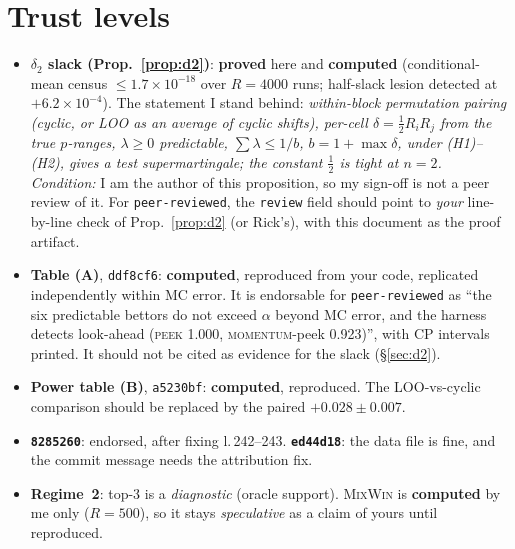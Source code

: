 \documentclass[11pt]{article}
\begin{document}
\section{Trust levels}\label{sec:trust}
\begin{itemize}[nosep]
\item \textbf{$\delta_2$ slack (Prop.~\ref{prop:d2})}: \textbf{proved} here and \textbf{computed} (conditional-mean census $\le1.7\times10^{-18}$ over $R=4000$ runs; half-slack lesion detected at $+6.2\times10^{-4}$). The statement I stand behind: \emph{within-block permutation pairing (cyclic, or LOO as an average of cyclic shifts), per-cell $\delta=\tfrac12R_iR_j$ from the true $p$-ranges, $\lambda\ge0$ predictable, $\sum\lambda\le1/b$, $b=1+\max\delta$, under (H1)--(H2), gives a test supermartingale; the constant $\tfrac12$ is tight at $n=2$.}
\emph{Condition:} I am the author of this proposition, so my sign-off is not a peer review of it. For \texttt{peer-reviewed}, the \texttt{review} field should point to \emph{your} line-by-line check of Prop.~\ref{prop:d2} (or Rick's), with this document as the proof artifact.
\item \textbf{Table (A)}, \texttt{ddf8cf6}: \textbf{computed}, reproduced from your code, replicated independently within MC error. It is endorsable for \texttt{peer-reviewed} as ``the six predictable bettors do not exceed $\alpha$ beyond MC error, and the harness detects look-ahead (\textsc{peek} 1.000, \textsc{momentum}-peek 0.923)'', with CP intervals printed. It should not be cited as evidence for the slack (\S\ref{sec:d2}).
\item \textbf{Power table (B)}, \texttt{a5230bf}: \textbf{computed}, reproduced. The LOO-vs-cyclic comparison should be replaced by the paired $+0.028\pm0.007$.
\item \textbf{\texttt{8285260}}: endorsed, after fixing l.\,242--243. \textbf{\texttt{ed44d18}}: the data file is fine, and the commit message needs the attribution fix.
\item \textbf{Regime~2}: top-3 is a \emph{diagnostic} (oracle support). \textsc{MixWin} is \textbf{computed} by me only ($R=500$), so it stays \emph{speculative} as a claim of yours until reproduced.
\end{itemize}
\end{document}
